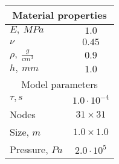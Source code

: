\begin{tabular}[h]{|l|c|}
\hline
\multicolumn{2}{|c|}{Material properties}\\
\hline
$E,\ MPa$ & $ 1.0$ \\ 
$\nu$ & $ 0.45$ \\ 
$\rho,\ \frac{g}{cm^3}$ & $ 0.9$ \\ 
$h,\ mm$ & $ 1.0$ \\
\hline
\multicolumn{2}{|c|}{Model parameters}\\ 
\hline
$\tau, s$ & $ 1.0\cdot 10^{-4}$ \\ 
Nodes & $31\times31$ \\ 
Size, $m$ & $ 1.0 \times  1.0$ \\
Pressure, $Pa$ & $2.0\cdot10^{5}$ \\
\hline
\end{tabular}